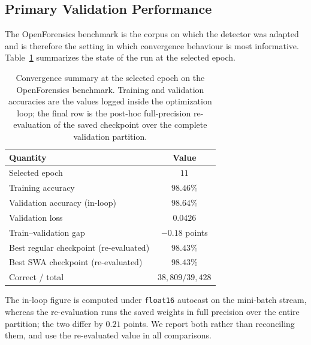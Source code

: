\documentclass[10pt,journal]{IEEEtran}
\begin{document}
\subsection{Primary Validation Performance}\label{sec:val}
The OpenForensics benchmark is the corpus on which the detector was adapted
and is therefore the setting in which convergence behaviour is most
informative. Table~\ref{tab:epoch} summarizes the state of the run at the
selected epoch.

\begin{table}[!t]
\caption{Convergence summary at the selected epoch on the OpenForensics
benchmark. Training and validation accuracies are the values logged inside
the optimization loop; the final row is the post-hoc full-precision
re-evaluation of the saved checkpoint over the complete validation partition.}
\label{tab:epoch}
\centering
\footnotesize
\begin{threeparttable}
\begin{tabular}{@{}lc@{}}
\toprule
Quantity & Value \\
\midrule
Selected epoch & $11$ \\
Training accuracy & $98.46\%$ \\
Validation accuracy (in-loop)\tnote{a} & $98.64\%$ \\
Validation loss & $0.0426$ \\
Train--validation gap & $-0.18$ points \\
\midrule
Best regular checkpoint (re-evaluated) & $98.43\%$ \\
Best SWA checkpoint (re-evaluated) & $98.43\%$ \\
Correct / total & $38{,}809/39{,}428$ \\
\bottomrule
\end{tabular}
\begin{tablenotes}[flushleft]\footnotesize
\item[a] The in-loop figure is computed under \texttt{float16} autocast on the
mini-batch stream, whereas the re-evaluation runs the saved weights in full
precision over the entire partition; the two differ by $0.21$ points. We
report both rather than reconciling them, and use the re-evaluated value in
all comparisons.
\end{tablenotes}
\end{threeparttable}
\end{table}
\end{document}
